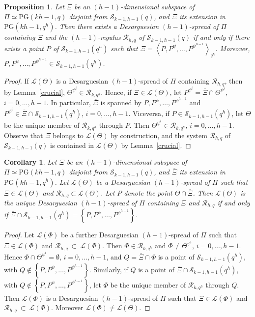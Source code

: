\documentclass[11pt]{article}
\newtheorem{prop}[theorem]{Proposition}
\newtheorem{cor}[theorem]{Corollary}
\theoremstyle{definition}
\numberwithin{equation}{section}
\def\cL{\mathcal L}
\def\cR{\mathcal R}
\def\cS{\mathcal S}
\def\PG{\mathrm{PG}}
\begin{document}
\begin{prop}\label{prop:point}
Let $\Xi$ be an $(h-1)$-dimensional subspace of $\Pi \simeq \PG(kh-1, q)$ disjoint from $\cS_{k-1, h-1}(q)$, and $\overline{\Xi}$ its extension in $\PG(kh-1, q^h)$. Then there exists a Desarguesian $(h-1)$-spread of $\Pi$ containing $\Xi$ and the $(h-1)$-regulus $\cR_{h, q}$ of $\cS_{k-1, h-1}(q)$ if and only if there exists a point $P$ of $\cS_{k-1, h-1}(q^h)$ such that $\overline{\Xi} = \left\langle P, P^\psi, \dots, P^{\psi^{h-1}} \right\rangle_{q^h}$. Moreover, $P, P^\psi, \dots, P^{\psi^{h-1}} \in \cS_{k-1, h-1}(q^h)$.
\end{prop}
\begin{proof}
If $\cL(\Theta)$ is a Desarguesian $(h-1)$-spread of $\Pi$ containing $\cR_{h, q}$, then by Lemma~\ref{crucial}, $\Theta^{\psi^i} \in \cR_{k, q^h}$. Hence, if $\Xi \in \cL(\Theta)$, let $P^{\psi^i} = \overline{\Xi} \cap \Theta^{\psi^i}$, $i = 0, \dots, h-1$. In particular, $\overline{\Xi}$ is spanned by $P, P^\psi, \dots, P^{\psi^{h-1}}$ and $P^{\psi^i} \in \overline{\Xi} \cap \cS_{k-1, h-1}(q^h)$, $i = 0, \dots, h-1$. Viceversa, if $P \in \cS_{k-1, h-1}(q^h)$, let $\Theta$ be the unique member of $\cR_{k, q^h}$ through $P$. Then $\Theta^{\psi^i} \in \cR_{k, q^h}$, $i = 0, \dots, h-1$. Observe that $\Xi$ belongs to $\cL(\Theta)$ by construction, and the system $\cR_{h, q}$ of $\cS_{k-1, h-1}(q)$ is contained in $\cL(\Theta)$ by Lemma~\ref{crucial}.
\end{proof}

\begin{cor}\label{cor:point}
Let $\Xi$ be an $(h-1)$-dimensional subspace of $\Pi \simeq \PG(kh-1, q)$ disjoint from $\cS_{k-1, h-1}(q)$, and $\overline{\Xi}$ its extension in $\PG(kh-1, q^h)$. Let $\cL(\Theta)$ be a Desarguesian $(h-1)$-spread of $\Pi$ such that $\Xi \in \cL(\Theta)$ and $\cR_{h, q} \subset \cL(\Theta)$. Let $P$ denote the point $\Theta \cap \overline{\Xi}$. Then $\cL(\Theta)$ is the unique Desarguesian $(h-1)$-spread of $\Pi$ containing $\Xi$ and $\cR_{h, q}$ if and only if $\overline{\Xi} \cap \cS_{k-1, h-1}(q^h) = \left\{P, P^\psi, \dots, P^{\psi^{h-1}} \right\}$.
\end{cor}
\begin{proof}
Let $\cL(\Phi)$ be a further Desarguesian $(h-1)$-spread of $\Pi$ such that $\Xi \in \cL(\Phi)$ and $\cR_{h, q}~\subset~\cL(\Phi)$. Then $\Phi \in \cR_{k, q^h}$ and $\Phi \ne \Theta^{\psi^i}$, $i = 0, \dots, h-1$. Hence $\Phi \cap \Theta^{\psi^i} = \emptyset$, $i = 0, \dots, h-1$, and $Q = \overline{\Xi} \cap \Phi$ is a point of $\cS_{k-1, h-1}(q^h)$, with $Q \notin \left\{ P, P^{\psi}, \dots, P^{\psi^{h-1}}\right\}$. Similarly, if $Q$ is a point of $\overline{\Xi} \cap \cS_{k-1, h-1}(q^h)$, with $Q \notin \left\{ P, P^{\psi}, \dots, P^{\psi^{h-1}}\right\}$, let $\Phi$ be the unique member of $\cR_{k, q^h}$ through $Q$. Then $\cL(\Phi)$ is a Desarguesian $(h-1)$-spread of $\Pi$ such that $\Xi \in \cL(\Phi)$ and $\cR_{h, q}~\subset~\cL(\Phi)$. Moreover $\cL(\Phi) \ne \cL(\Theta)$.  
\end{proof}
\end{document}
